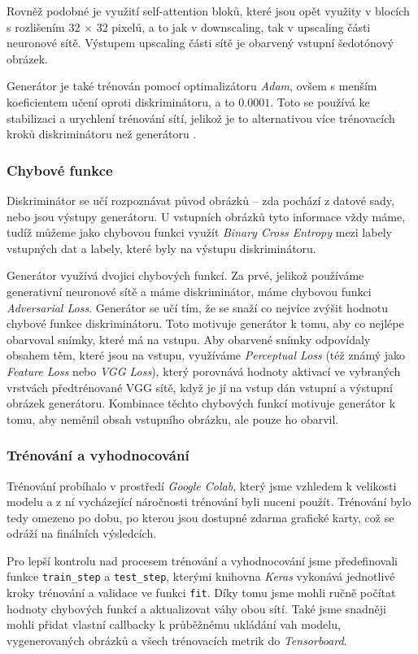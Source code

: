 \documentclass[12pt, a4paper]{article}
\begin{document}
    Rovněž podobné je využití self-attention bloků, které jsou opět využity v blocích s rozlišením 32 $\times$ 32 pixelů, a to jak v downscaling, tak v upscaling části neuronové sítě. Výstupem upscaling části sítě je obarvený vstupní šedotónový obrázek. 
    
    Generátor je také trénován pomocí optimalizátoru \textit{Adam}, ovšem s menším koeficientem učení oproti diskriminátoru, a to $0.0001$. Toto se používá ke stabilizaci a urychlení trénování sítí, jelikož je to alternativou více trénovacích kroků diskriminátoru než generátoru \cite{ttur}. 
    
    \subsubsection{Chybové funkce}
    Diskriminátor se učí rozpoznávat původ obrázků -- zda pochází z datové sady, nebo jsou výstupy generátoru. U vstupních obrázků tyto informace vždy máme, tudíž můžeme jako chybovou funkci využít \textit{Binary Cross Entropy} mezi labely vstupných dat a labely, které byly na výstupu diskriminátoru.
    
    Generátor využívá dvojici chybových funkcí. Za prvé, jelikož používáme generativní neuronové sítě a máme diskriminátor, máme chybovou funkci \textit{Adversarial Loss}. Generátor se učí tím, že se snaží co nejvíce zvýšit hodnotu chybové funkce diskriminátoru. Toto motivuje generátor k tomu, aby co nejlépe obarvoval snímky, které má na vstupu.
    Aby obarvené snímky odpovídaly obsahem těm, které jsou na vstupu, využíváme \textit{Perceptual Loss} (též známý jako \textit{Feature Loss} nebo \textit{VGG Loss}), který porovnává hodnoty aktivací ve vybraných vrstvách předtrénované VGG sítě, když je jí na vstup dán vstupní a výstupní obrázek generátoru.
    Kombinace těchto chybových funkcí motivuje generátor k tomu, aby neměnil obsah vstupního obrázku, ale pouze ho obarvil.
    
    \subsubsection{Trénování a vyhodnocování}
    Trénování probíhalo v prostředí \textit{Google Colab}, který jsme vzhledem k velikosti modelu a z ní vycházející náročnosti trénování byli nuceni použít. Trénování bylo tedy omezeno po dobu, po kterou jsou dostupné zdarma grafické karty, což se odráží na finálních výsledcích. 
    
    Pro lepší kontrolu nad procesem trénování a vyhodnocování jsme předefinovali funkce \texttt{train\_step} a \texttt{test\_step}, kterými knihovna \textit{Keras} vykonává jednotlivé kroky trénování a validace ve funkci \texttt{fit}. Díky tomu jsme mohli ručně počítat hodnoty chybových funkcí a aktualizovat váhy obou sítí. Také jsme snadněji mohli přidat vlastní callbacky k průběžnému ukládání vah modelu, vygenerovaných obrázků a všech trénovacích metrik do \textit{Tensorboard}.
    
\end{document}
